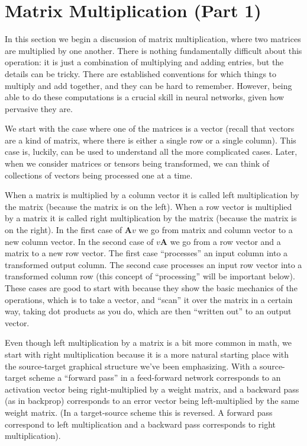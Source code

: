 \section{Matrix Multiplication (Part 1)}\label{matrixProduct1}

In this section we begin a discussion of matrix multiplication, where two matrices are multiplied by one another. There is nothing fundamentally difficult about this operation: it is just a combination of multiplying and adding entries, but the details can be tricky. There are established conventions for which things to multiply and add together, and they can be hard to remember. However, being able to do these computations is a crucial skill in neural networks, given how pervasive they are. 

We start with the case where one of the matrices is a vector (recall that vectors are a kind of matrix, where there is either a single row or a single column). This case is, luckily, can be used to understand all the more complicated cases. Later, when we consider matrices or tensors being transformed, we can think of collections of vectors being processed one at a time.

When a matrix is multiplied by a column vector it is called left multiplication by the matrix (because the matrix is on the left). When a row vector is multiplied by a matrix it is called right multiplication by the matrix (because the matrix is on the right). In the first case of $\mathbf{A}v$ we go from matrix and column vector to a new column vector. In the second case of $v\mathbf{A}$ we go from a row vector and a matrix to a new row vector. The first case ``processes'' an input column into a transformed output column. The second case processes an input row vector into a transformed column row (this concept of ``processing'' will be important below). These cases are good to start with because they show the basic mechanics of the operations, which is to take a vector, and ``scan'' it over the matrix in a certain way, taking dot products as you do, which are then ``written out'' to an output vector. 

Even though left multiplication by a matrix is a bit more common in math, we start with right multiplication because it is a more natural starting place with the source-target graphical structure we've been emphasizing. With a source-target scheme a  ``forward pass'' in a feed-forward network corresponds to an activation vector being right-multiplied by a weight matrix, and a backward pass (as in backprop) corresponds to an error vector being left-multiplied by the same weight matrix. (In a target-source scheme this is reversed. A forward pass correspond to left multiplication and a backward pass corresponds to right multiplication).

